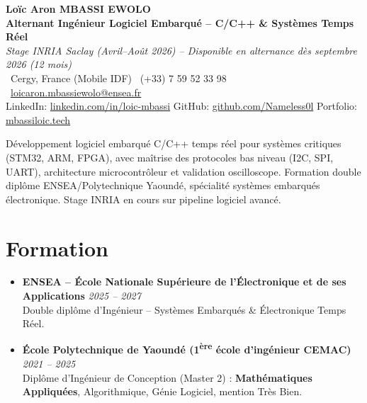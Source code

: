 \documentclass[a4paper,11pt]{article}
\begin{document}
\begin{center}
    {\Large \textbf{Lo\"ic Aron MBASSI EWOLO}} \\ \vspace{4pt}
    \textbf{\large Alternant Ing\'enieur Logiciel Embarqu\'e -- C/C++ \& Syst\`emes Temps R\'eel} \\
    \textit{\small Stage INRIA Saclay (Avril--Ao\^ut 2026) -- Disponible en alternance d\`es septembre 2026 (12 mois)} \\ \vspace{4pt}
    \small
    \Pointinghand\ Cergy, France (Mobile IDF) \quad \Mobilefone\ (+33) 7 59 52 33 98 \quad
    {\color{primary}\Letter\ \href{mailto:loicaron.mbassiewolo@ensea.fr}{loicaron.mbassiewolo@ensea.fr}} \\ \vspace{2pt}
    {\color{primary}LinkedIn: \href{https://www.linkedin.com/in/loic-mbassi/}{linkedin.com/in/loic-mbassi}} \quad
    {\color{primary}GitHub: \href{https://github.com/Nameless0l}{github.com/Nameless0l}} \quad
    {\color{primary}Portfolio: \href{https://mbassiloic.tech}{mbassiloic.tech}}
\end{center}
\vspace{-6pt}
\noindent\small{D\'eveloppement logiciel embarqu\'e C/C++ temps r\'eel pour syst\`emes critiques (STM32, ARM, FPGA), avec maîtrise des protocoles bas niveau (I2C, SPI, UART), architecture microcontr\^oleur et validation oscilloscope. Formation double dipl\^ome ENSEA/Polytechnique Yaound\'e, sp\'ecialit\'e syst\`emes embarqu\'es \'electronique. Stage INRIA en cours sur pipeline logiciel avanc\'e.}

\section{Formation}
\begin{itemize}[leftmargin=*, label=\tiny$\bullet$, nosep]
    \item \textbf{ENSEA -- \'Ecole Nationale Sup\'erieure de l'\'Electronique et de ses Applications} \hfill \textit{2025 -- 2027} \\
    \small{Double dipl\^ome d'Ing\'enieur -- Syst\`emes Embarqu\'es \& \'Electronique Temps R\'eel.}
    \item \textbf{\'Ecole Polytechnique de Yaound\'e (1\textsuperscript{\`ere} \'ecole d'ing\'enieur CEMAC)} \hfill \textit{2021 -- 2025} \\
    \small{Dipl\^ome d'Ing\'enieur de Conception (Master 2) : \textbf{Math\'ematiques Appliqu\'ees}, Algorithmique, G\'enie Logiciel, mention Tr\`es Bien.}
\end{itemize}
\end{document}
